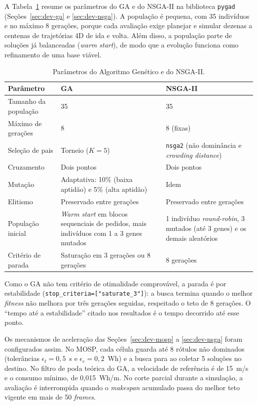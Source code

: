 A Tabela~\ref{tab:parametros} resume os parâmetros do GA e do NSGA-II na biblioteca \texttt{pygad} (Seções~\ref{sec:dev-ga} e \ref{sec:dev-nsga}). A população é pequena, com 35 indivíduos e no máximo 8 gerações, porque cada avaliação exige planejar e simular dezenas a centenas de trajetórias 4D de ida e volta. Além disso, a população parte de soluções já balanceadas (\textit{warm start}), de modo que a evolução funciona como refinamento de uma base viável.

\begin{table}[htbp]
\centering
\small
\caption{Parâmetros do Algoritmo Genético e do NSGA-II.}
\label{tab:parametros}
\begin{tabular}{p{4.2cm}p{4.6cm}p{4.6cm}}
\toprule
\textbf{Parâmetro} & \textbf{GA} & \textbf{NSGA-II} \\
\midrule
Tamanho da população & 35 & 35 \\
Máximo de gerações & 8 & 8 (fixas) \\
Seleção de pais & Torneio ($K=5$) & \texttt{nsga2} (não dominância e \textit{crowding distance}) \\
Cruzamento & Dois pontos & Dois pontos \\
Mutação & Adaptativa: 10\% (baixa aptidão) e 5\% (alta aptidão) & Idem \\
Elitismo & Preservado entre gerações & Preservado entre gerações \\
População inicial & \textit{Warm start} em blocos sequenciais de pedidos, mais indivíduos com 1 a 3 genes mutados & 1 indivíduo \textit{round-robin}, 3 mutados (até 3 genes) e os demais aleatórios \\
Critério de parada & Saturação em 3 gerações ou 8 gerações & 8 gerações \\
\bottomrule
\end{tabular}
\end{table}

Como o GA não tem critério de otimalidade comprovável, a parada é por estabilidade (\texttt{stop\_criteria=["saturate\_3"]}): a busca termina quando o melhor \textit{fitness} não melhora por três gerações seguidas, respeitado o teto de 8 gerações. O ``tempo até a estabilidade'' citado nos resultados é o tempo decorrido até esse ponto.

Os mecanismos de aceleração das Seções~\ref{sec:dev-mosp} a \ref{sec:dev-nsga} foram configurados assim. No MOSP, cada célula guarda até 8 rótulos não dominados (tolerâncias $\epsilon_t = 0{,}5$~s e $\epsilon_e = 0{,}2$~Wh) e a busca para ao coletar 5 soluções no destino. No filtro de poda teórica do GA, a velocidade de referência é de 15~m/s e o consumo mínimo, de 0,015~Wh/m. No corte parcial durante a simulação, a avaliação é interrompida quando o \textit{makespan} acumulado passa do melhor teto vigente em mais de 50 \textit{frames}.

